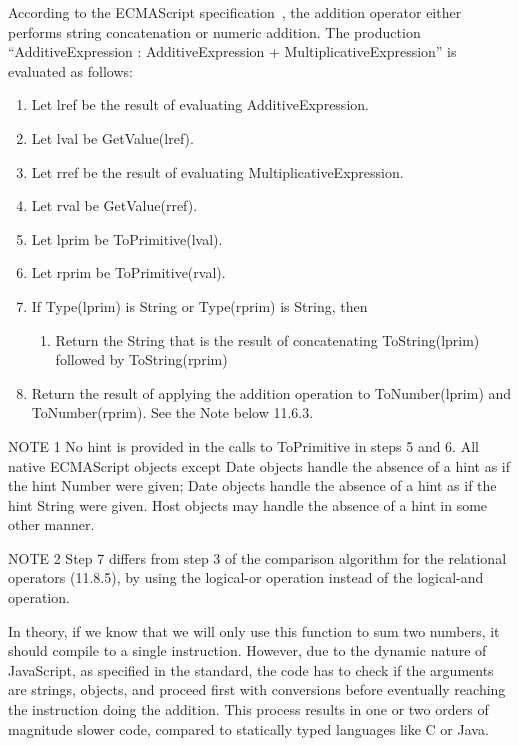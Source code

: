 \begin{displayquote}
According to the ECMAScript specification~\cite{ecmascript},
the addition operator either performs string concatenation or numeric addition.
The production ``AdditiveExpression : AdditiveExpression + MultiplicativeExpression''
is evaluated as follows:

\begin{enumerate}
    \item Let lref be the result of evaluating AdditiveExpression.
    \item Let lval be GetValue(lref).
    \item Let rref be the result of evaluating MultiplicativeExpression.
    \item Let rval be GetValue(rref).
    \item Let lprim be ToPrimitive(lval).
    \item Let rprim be ToPrimitive(rval).
    \item If Type(lprim) is String or Type(rprim) is String, then
    \begin{enumerate}
        \item     Return the String that is the result of concatenating ToString(lprim) followed by ToString(rprim)
    \end{enumerate}
    \item Return the result of applying the addition operation to ToNumber(lprim) and ToNumber(rprim). See the Note below 11.6.3.
\end{enumerate}

NOTE 1 No hint is provided in the calls to ToPrimitive in steps 5 and 6. All native ECMAScript objects except Date objects handle the absence of a hint as if the hint Number were given; Date objects handle the absence of a hint as if the hint String were given. Host objects may handle the absence of a hint in some other manner.

NOTE 2 Step 7 differs from step 3 of the comparison algorithm for the relational operators (11.8.5), by using the logical-or operation instead of the logical-and operation.
\end{displayquote}

In theory, if we know that we will only use this function
to sum two numbers, it should compile to a single instruction.
However, due to the dynamic nature of JavaScript,
as specified in the standard, the code has to check if the arguments
are strings, objects, and proceed first with conversions before
eventually reaching the instruction doing the addition.
This process results in one or two orders of magnitude slower code,
compared to statically typed languages like C or Java.

